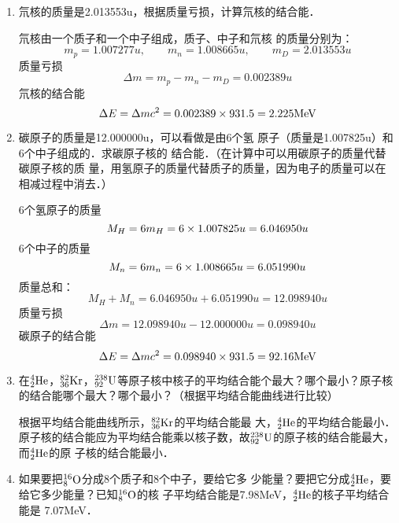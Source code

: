 \begin{enumerate}
    \item 氘核的质量是2.013553u，根据质量亏损，计算氘核的结合能．

    \begin{solution}
氘核由一个质子和一个中子组成，质子、中子和氘核
的质量分别为：
\[m_p=1.007277u,\qquad m_n=1.008665u,\qquad m_D=2.013553u\]
质量亏损 
\[\Delta m=m_p-m_n-m_D=0.002389u\]
氘核的结合能
\[\Delta E=\Delta mc^2=0.002389\x 931.5=2.225{\rm MeV}\]
    \end{solution}
    \item 碳原子的质量是12.000000u，可以看做是由6个氢
原子（质量是1.007825u）和6个中子组成的．求碳原子核的
结合能．（在计算中可以用碳原子的质量代替碳原子核的质
量，用氢原子的质量代替质子的质量，因为电子的质量可以在
相减过程中消去．）

\begin{solution}
    6个氢原子的质量
\[M_H=6m_H=6\x 1.007825u=6.046950u\]
6个中子的质量
\[M_n=6m_n=6\x1.008665u=6.051990u\]
质量总和：
\[M_H+M_n=6.046950u+6.051990u=12.098940u\]
质量亏损
\[\Delta m=12.098940u-12.000000u=0.098940u\]
碳原子的结合能
\[\Delta E=\Delta mc^2=0.098940\x931.5=92.16{\rm MeV}\]
\end{solution}
\item  在$\atom{He}{4}{2}$，$\atom{Kr}{82}{36}$，$\atom{U}{238}{92}$等原子核中核子的平均结合能个最大？哪个最小？原子核的结合能哪个最大？哪个最小？（根据平均结合能曲线进行比较）


\begin{solution}
    根据平均结合能曲线所示，$\atom{Kr}{82}{36}$的平均结合能最
    大，$\atom{He}{4}{2}$的平均结合能最小．原子核的结合能应为平均结合能乘以核子数，故$\atom{U}{238}{92}$的原子核的结合能最大，而$\atom{He}{4}{2}$的原
    子核的结合能最小．
\end{solution}
\item 如果要把$\atom{O}{16}{8}$分成8个质子和8个中子，要给它多
少能量？要把它分成$\atom{He}{4}{2}$，要给它多少能量？已知$\atom{O}{16}{8}$的核
子平均结合能是7.98MeV，$\atom{He}{4}{2}$的核子平均结合能是
7.07MeV．


\end{enumerate}
